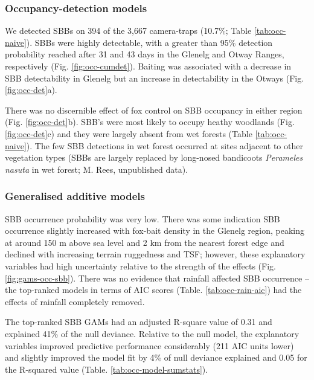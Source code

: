 \documentclass[11pt,a4paper,titlepage,twoside,openright]{style/unimelbthesis}
\begin{document}
\begin{mainmatter}
\hypertarget{occupancy-detection-models-3}{%
\subsubsection{Occupancy-detection models}\label{occupancy-detection-models-3}}

We detected SBBs on 394 of the 3,667 camera-traps (10.7\%; Table \ref{tab:occ-naive}). SBBs were highly detectable, with a greater than 95\% detection probability reached after 31 and 43 days in the Glenelg and Otway Ranges, respectively (Fig. \ref{fig:occ-cumdet}). Baiting was associated with a decrease in SBB detectability in Glenelg but an increase in detectability in the Otways (Fig. \ref{fig:occ-det}a).

There was no discernible effect of fox control on SBB occupancy in either region (Fig. \ref{fig:occ-det}b). SBB's were most likely to occupy heathy woodlands (Fig. \ref{fig:occ-det}c) and they were largely absent from wet forests (Table \ref{tab:occ-naive}). The few SBB detections in wet forest occurred at sites adjacent to other vegetation types (SBBs are largely replaced by long-nosed bandicoots \emph{Perameles nasuta} in wet forest; M. Rees, unpublished data).

\hypertarget{generalised-additive-models-3}{%
\subsubsection{Generalised additive models}\label{generalised-additive-models-3}}

SBB occurrence probability was very low. There was some indication SBB occurrence slightly increased with fox-bait density in the Glenelg region, peaking at around 150 m above sea level and 2 km from the nearest forest edge and declined with increasing terrain ruggedness and TSF; however, these explanatory variables had high uncertainty relative to the strength of the effects (Fig. \ref{fig:gams-occ-sbb}). There was no evidence that rainfall affected SBB occurrence -- the top-ranked models in terms of AIC scores (Table. \ref{tab:occ-rain-aic}) had the effects of rainfall completely removed.

The top-ranked SBB GAMs had an adjusted R-square value of 0.31 and explained 41\% of the null deviance. Relative to the null model, the explanatory variables improved predictive performance considerably (211 AIC units lower) and slightly improved the model fit by 4\% of null deviance explained and 0.05 for the R-squared value (Table. \ref{tab:occ-model-sumstats}).


\end{mainmatter}
\end{document}
